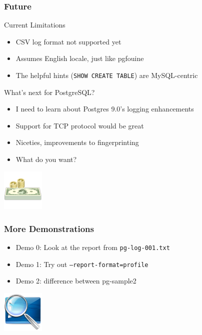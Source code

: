 \begin{frame}
   \frametitle{Future}
   \begin{block}{Current Limitations}
   \begin{itemize}
      \item CSV log format not supported yet
      \item Assumes English locale, just like pgfouine
      \item The helpful hints (\texttt{SHOW CREATE TABLE}) are MySQL-centric
   \end{itemize}
   \end{block}
   \begin{block}{What's next for PostgreSQL?}
   \begin{itemize}
      \item I need to learn about Postgres 9.0's logging enhancements
      \item Support for TCP protocol would be great
      \item Niceties, improvements to fingerprinting
      \item What do you want?
   \end{itemize}
   \end{block}
   \includegraphics[width=20mm]{../image/money}
\end{frame}

\begin{frame}
   \frametitle{More Demonstrations}
   \begin{itemize}
      \item Demo 0: Look at the report from \texttt{pg-log-001.txt}
      \item Demo 1: Try out \texttt{--report-format=profile}
      \item Demo 2: difference between pg-sample2
   \end{itemize}
   \includegraphics[width=20mm]{../image/demo}
\end{frame}
